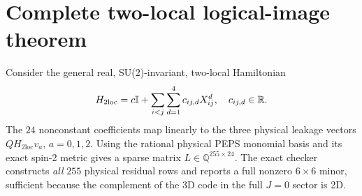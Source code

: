 \documentclass[aps,pra,twocolumn,nofootinbib,superscriptaddress,10pt]{revtex4-2}
\begin{document}
\section{Complete two-local logical-image theorem}
Consider the general real, SU(2)-invariant, two-local Hamiltonian
\begin{equation}\label{eq:Hgen}
H_{2\mathrm{loc}}=c\mathbb I+\sum_{i<j}\sum_{d=1}^4c_{ij,d}X_{ij}^{d},\quad c_{ij,d}\in\mathbb R.
\end{equation}
The $24$ nonconstant coefficients map linearly to the three physical leakage vectors $QH_{2\mathrm{loc}}v_a$, $a=0,1,2$. Using the rational physical PEPS monomial basis and its exact spin-2 metric gives a sparse matrix $L\in\mathbb Q^{255\times24}$. The exact checker constructs \emph{all} $255$ physical residual rows and reports a full nonzero $6\times6$ minor, sufficient because the complement of the 3D code in the full $J=0$ sector is 2D.
\end{document}

